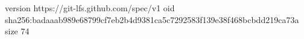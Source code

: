 version https://git-lfs.github.com/spec/v1
oid sha256:badaaab989e68799cf7eb2b4d9381ca5c7292583f139e38f468bcbdd219ca73a
size 74
